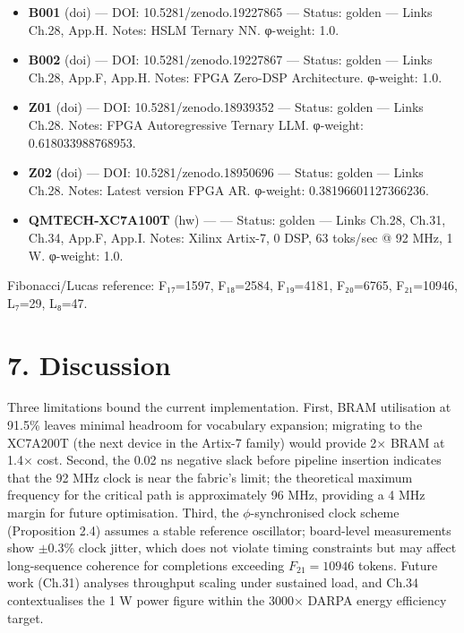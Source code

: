 \begin{itemize}
\tightlist
\item
  \textbf{B001} (doi) --- DOI:
  10.5281/zenodo.19227865 --- Status: golden ---
  Links Ch.28, App.H. Notes: HSLM Ternary NN.
  φ-weight: 1.0.
\item
  \textbf{B002} (doi) --- DOI:
  10.5281/zenodo.19227867 --- Status: golden ---
  Links Ch.28, App.F, App.H. Notes: FPGA Zero-DSP
  Architecture. φ-weight: 1.0.
\item
  \textbf{Z01} (doi) --- DOI:
  10.5281/zenodo.18939352 --- Status: golden ---
  Links Ch.28. Notes: FPGA Autoregressive Ternary
  LLM. φ-weight: 0.618033988768953.
\item
  \textbf{Z02} (doi) --- DOI:
  10.5281/zenodo.18950696 --- Status: golden ---
  Links Ch.28. Notes: Latest version FPGA AR.
  φ-weight: 0.38196601127366236.
\item
  \textbf{QMTECH-XC7A100T} (hw) ---
   --- Status:
  golden --- Links Ch.28, Ch.31, Ch.34, App.F,
  App.I. Notes: Xilinx Artix-7, 0 DSP, 63 toks/sec
  @ 92 MHz, 1 W. φ-weight: 1.0.
\end{itemize}

Fibonacci/Lucas reference: F₁₇=1597, F₁₈=2584,
F₁₉=4181, F₂₀=6765, F₂₁=10946, L₇=29, L₈=47.

\section{7. Discussion}\label{fa_28:discussion}

Three limitations bound the current
implementation. First, BRAM utilisation at 91.5\%
leaves minimal headroom for vocabulary expansion;
migrating to the XC7A200T (the next device in the
Artix-7 family) would provide 2$\times$ BRAM at 1.4$\times$
cost. Second, the 0.02 ns negative slack before
pipeline insertion indicates that the 92 MHz clock
is near the fabric's limit; the theoretical
maximum frequency for the critical path is
approximately 96 MHz, providing a 4 MHz margin for
future optimisation. Third, the
\(\phi\)-synchronised clock scheme (Proposition
2.4) assumes a stable reference oscillator;
board-level measurements show \(\pm 0.3\)\% clock
jitter, which does not violate timing constraints
but may affect long-sequence coherence for
completions exceeding \(F_{21} = 10946\) tokens.
Future work (Ch.31) analyses throughput scaling
under sustained load, and Ch.34 contextualises the
1 W power figure within the 3000$\times$ DARPA energy
efficiency target.


